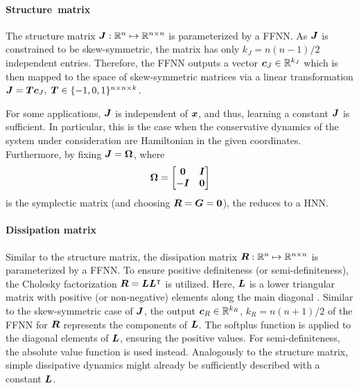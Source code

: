 \paragraph{Structure~matrix}
The structure matrix $\boldsymbol{J}: {\mathbb{R}}^n  \mapsto  {\mathbb{R}}^{n\times n}$ is parameterized by a \gls{FFNN}. 
As $\boldsymbol{J}$ is constrained to be skew-symmetric, the matrix has only ${k_J=n(n-1)/2}$ independent entries. 
Therefore, the \gls{FFNN} outputs a vector $\boldsymbol{c}_J\in{\mathbb{R}}^{k_J}$ which is then mapped to the space of skew-symmetric matrices via a linear transformation $\boldsymbol{J}=\boldsymbol{T}\boldsymbol{c}_J,\; \boldsymbol{T}\in\{-1, 0, 1\}^{n\times n\times k}$.

For some applications, $\boldsymbol{J}$ is independent of $\boldsymbol{x}$, and thus, learning a constant $\boldsymbol{J}$ is sufficient. 
In particular, this is the case when the conservative dynamics of the system under consideration are Hamiltonian in the given coordinates.
Furthermore, by fixing $\boldsymbol{J}=\boldsymbol{\Omega}$, where 
\begin{equation}
    \boldsymbol{\Omega} = \begin{bmatrix}
        \boldsymbol{0} & \boldsymbol{I} \\ -\boldsymbol{I} & \boldsymbol{0}
    \end{bmatrix}
\end{equation}
is the symplectic matrix (and choosing $\boldsymbol{R}=\boldsymbol{G}=\boldsymbol{0}$), the \sPHNN reduces to a \gls{HNN}.

\vspace*{-2mm}

\paragraph{Dissipation matrix}
Similar to the structure matrix, the dissipation matrix $\boldsymbol{R}: {\mathbb{R}}^n\mapsto{\mathbb{R}}^{n\times n}$ is parameterized by a \gls{FFNN}. To ensure positive definiteness (or semi-definiteness), the Cholesky factorization $\boldsymbol{R}=\boldsymbol{L}\boldsymbol{L}^{\intercal}$ is utilized. Here, $\boldsymbol{L}$ is a lower triangular matrix with positive (or non-negative) elements along the main diagonal \cite{horn2017}. Similar to the skew-symmetric case of $\boldsymbol{J}$, the output ${\boldsymbol{c}_R\in{\mathbb{R}}^{k_R}}$, ${k_R=n(n+1)/2}$ of the \gls{FFNN} for $\boldsymbol{R}$ represents the components of $\boldsymbol{L}$. 
The softplus function is applied to the diagonal elements of $\boldsymbol{L}$, ensuring the positive values. For semi-definiteness, the absolute value function is used instead.
Analogously to the structure matrix, simple dissipative dynamics might already be sufficiently described with a constant $\boldsymbol{L}$.

\vspace*{-2mm}

